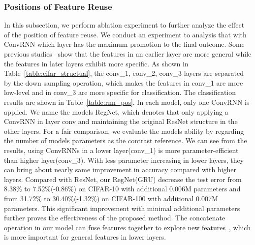 \documentclass[journal,comsoc]{IEEEtran}
\begin{document}
\subsubsection{Positions of Feature Reuse}
In this subsection, we perform ablation experiment to further analyze the effect of the position of feature reuse. We conduct an experiment to analysis that with ConvRNN which layer has the maximum promotion to the final outcome. Some previous studies~\cite{DBLP:journals/corr/YosinskiCBL14} show that the features in an earlier layer are more general while the features in later layers exhibit more specific. As shown in Table~\ref{table:cifar_structual}, the conv\_1, conv\_2, conv\_3 layers are separated by the down sampling operation, which makes the features in conv\_1 are more low-level and in conv\_3 are more specific for classification.  The classification results are shown in Table~\ref{table:rnn_pos}. In each model, only one ConvRNN is applied. We name the models RegNet,  which denotes that only applying a ConvRNN in layer conv and maintaining the original ResNet structure in the other layers. For a fair comparison, we evaluate the models ability by regarding the number of models parameters as the contrast reference. We can see from the results, using ConvRNNs in a lower layer(conv\_1) is more parameter-efficient than higher layer(conv\_3). With less parameter increasing in lower layers, they can bring about nearly same improvement in accuracy compared with higher layers. Compared with ResNet, our RegNet(GRU) decrease the test error from 8.38\% to 7.52\%(-0.86\%) on CIFAR-10 with additional 0.006M parameters and from 31.72\% to 30.40\%(-1.32\%) on CIFAR-100 with additional 0.007M parameters. This significant improvement with minimal additional parameters further proves the effectiveness of the proposed method. The concatenate operation in our model can fuse features together to explore new features~\cite{DBLP:journals/corr/ChenLXJYF17}, which is more important for general features in lower layers. 
\end{document}
